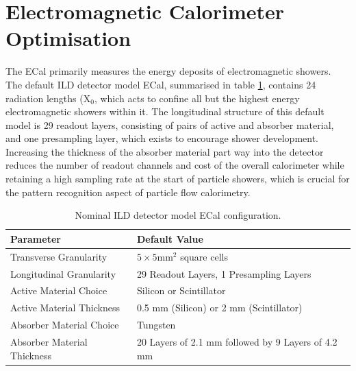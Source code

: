 \section{Electromagnetic Calorimeter Optimisation}
\label{sec:ecal}
The ECal primarily measures the energy deposits of electromagnetic showers.  The default ILD detector model ECal, summarised in table \ref{table:defaultildecal}, contains 24 radiation lengths ($\text{X}_{0}$, which acts to confine all but the highest energy electromagnetic showers within it.  The longitudinal structure of this default model is 29 readout layers, consisting of pairs of active and absorber material, and one presampling layer, which exists to encourage shower development.  Increasing the thickness of the absorber material part way into the detector reduces the number of readout channels and cost of the overall calorimeter while retaining a high sampling rate at the start of particle showers, which is crucial for the pattern recognition aspect of particle flow calorimetry.  

\begin{table}[h!]
\centering
\begin{tabular}{ l l}
\hline
Parameter & Default Value \\
\hline
Transverse Granularity & $5 \times 5 \text{mm}^{2}$ square cells \\
Longitudinal Granularity & 29 Readout Layers, 1 Presampling Layers \\
Active Material Choice & Silicon or Scintillator  \\
Active Material Thickness & 0.5 mm (Silicon) or 2 mm (Scintillator)  \\
Absorber Material Choice & Tungsten \\
Absorber Material Thickness & 20 Layers of 2.1 mm followed by 9 Layers of 4.2 mm \\
\hline
\end{tabular}
\caption[Nominal ILD detector model ECal configuration.]{Nominal ILD detector model ECal configuration.}
\label{table:defaultildecal}
\end{table}

